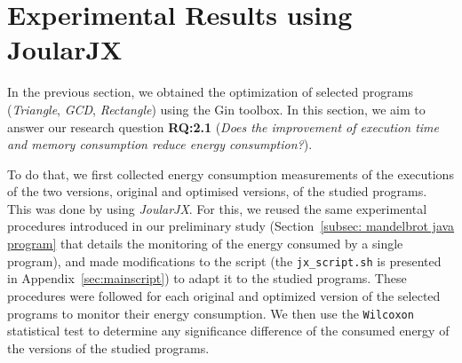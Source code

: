 

\vspace{-10pt}
\section{Experimental Results using JoularJX }


In the previous section, we obtained the optimization of selected programs (\ie \textit{Triangle}, \textit{GCD}, \textit{Rectangle}) using the Gin toolbox. 
In this section, 
we aim to answer our research question \textbf{RQ:2.1} (\ie \textit{Does the improvement of execution time and memory consumption reduce energy consumption?}). 

\vspace{.5em}
To do that, we first collected energy consumption measurements of the executions of the two versions, \ie original and optimised versions, of the studied programs. This was done by using \textit{JoularJX}. For this, we reused the same experimental procedures introduced in our preliminary study (\ie Section~\ref{subsec: mandelbrot java program} that details the monitoring of the energy consumed by a single program), and made modifications to the script (the \texttt{jx\_script.sh} is presented in Appendix~\ref{sec:mainscript}) to adapt it to the studied programs. 
These procedures were followed for each original and optimized version of the selected programs to monitor their energy consumption. 
We then use the \texttt{Wilcoxon} statistical test to determine any significance difference of the consumed energy of the versions of the studied programs.  


